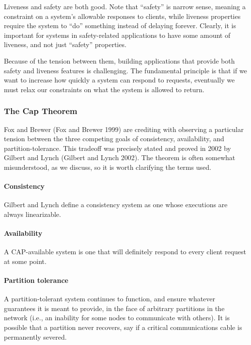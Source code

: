 \documentclass[]             %
{NASA}                       %
\theoremstyle{definition}
\begin{document}
Liveness and safety are both good. Note that ``safety'' is narrow sense,
meaning a constraint on a system's allowable responses to clients, while
liveness properties require the system to ``do'' something instead of
delaying forever. Clearly, it is important for systems in safety-related
applications to have some amount of liveness, and not just ``safety''
properties.

Because of the tension between them, building applications that provide
both safety and liveness features is challenging. The fundamental
principle is that if we want to increase how quickly a system can
respond to requests, eventually we must relax our constraints on what
the system is allowed to return.

\hypertarget{the-cap-theorem-1}{%
\subsubsection{The Cap Theorem}\label{the-cap-theorem-1}}

Fox and Brewer (Fox and Brewer 1999) are crediting with observing a
particular tension between the three competing goals of consistency,
availability, and partition-tolerance. This tradeoff was precisely
stated and proved in 2002 by Gilbert and Lynch (Gilbert and Lynch 2002).
The theorem is often somewhat misunderstood, as we discuss, so it is
worth clarifying the terms used.

\hypertarget{consistency}{%
\paragraph{Consistency}\label{consistency}}

Gilbert and Lynch define a consistency system as one whose executions
are always linearizable.

\hypertarget{availability}{%
\paragraph{Availability}\label{availability}}

A CAP-available system is one that will definitely respond to every
client request at some point.

\hypertarget{partition-tolerance}{%
\paragraph{Partition tolerance}\label{partition-tolerance}}

A partition-tolerant system continues to function, and ensure whatever
guarantees it is meant to provide, in the face of arbitrary partitions
in the network (i.e., an inability for some nodes to communicate with
others). It is possible that a partition never recovers, say if a
critical communications cable is permanently severed.
\end{document}
